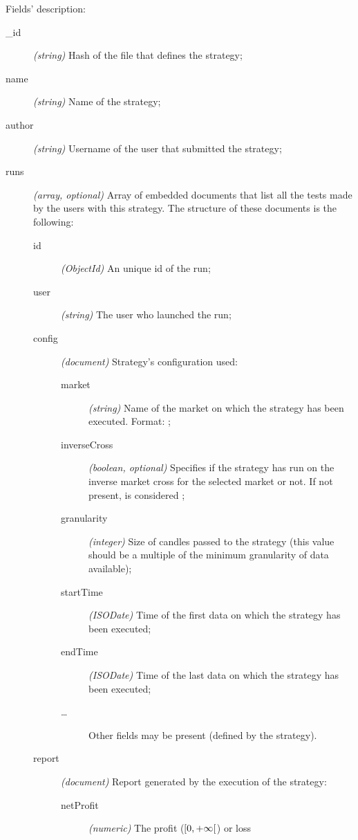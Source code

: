 Fields' description:
\begin{description}
	\item[\_id] \textit{(string)} Hash of the file that defines the
		strategy;
	\item[name] \textit{(string)} Name of the strategy;
	\item[author] \textit{(string)} Username of the user that submitted the
		strategy;
	\item[runs] \textit{(array, optional)} Array of embedded documents that
		list all the tests made by the users with this strategy. The
		structure of these documents is the following:
		\begin{description}
			\item[id] \textit{(ObjectId)} An unique id of the run;
			\item[user] \textit{(string)} The user who launched the
				run;
			\item[config] \textit{(document)} Strategy's
				configuration used:
				\begin{description}
					\item[market] \textit{(string)} Name of
						the market on which the strategy
						has been executed. Format:
						;
					\item[inverseCross] \textit{(boolean,
						optional)} Specifies if the
						strategy has run on the inverse
						market cross for the selected
						market or not. If not present,
						is considered ;
					\item[granularity] \textit{(integer)}
						Size of candles passed to the
						strategy (this value should be a
						multiple of the minimum
						granularity of data available);
					\item[startTime]
						\textit{(ISODate)} Time of the
						first data on which the strategy
						has been executed;
					\item[endTime]
						\textit{(ISODate)} Time of the
						last data on which the strategy
						has been executed;
					\item[\ldots] Other fields may be
						present (defined by the
						strategy).
				\end{description}
			\item[report] \textit{(document)} Report generated by
				the execution of the strategy:
				\begin{description}
					\item[netProfit] \textit{(numeric)} The
						profit (\(\interval[open
						right]{0}{+\infty}\)) or loss

\end{description}
\end{description}
\end{description}

